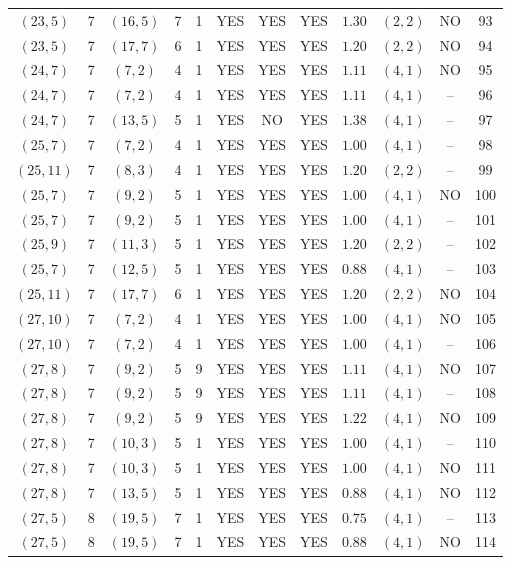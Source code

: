 \begin{longtable}{|c|c|c|c|c|c|c|c|c|c|c|c|}
$(23,5)$ & 7 & $(16,5)$ & 7 & 1 & YES & YES & YES & $1.30$ & $(2,2)$ & NO & 93\\
$(23,5)$ & 7 & $(17,7)$ & 6 & 1 & YES & YES & YES & $1.20$ & $(2,2)$ & NO & 94\\
$(24,7)$ & 7 & $(7,2)$ & 4 & 1 & YES & YES & YES & $1.11$ & $(4,1)$ & NO & 95\\
$(24,7)$ & 7 & $(7,2)$ & 4 & 1 & YES & YES & YES & $1.11$ & $(4,1)$ & -- & 96\\
$(24,7)$ & 7 & $(13,5)$ & 5 & 1 & YES & NO & YES & $1.38$ & $(4,1)$ & -- & 97\\
$(25,7)$ & 7 & $(7,2)$ & 4 & 1 & YES & YES & YES & $1.00$ & $(4,1)$ & -- & 98\\
$(25,11)$ & 7 & $(8,3)$ & 4 & 1 & YES & YES & YES & $1.20$ & $(2,2)$ & -- & 99\\
$(25,7)$ & 7 & $(9,2)$ & 5 & 1 & YES & YES & YES & $1.00$ & $(4,1)$ & NO & 100\\
$(25,7)$ & 7 & $(9,2)$ & 5 & 1 & YES & YES & YES & $1.00$ & $(4,1)$ & -- & 101\\
$(25,9)$ & 7 & $(11,3)$ & 5 & 1 & YES & YES & YES & $1.20$ & $(2,2)$ & -- & 102\\
$(25,7)$ & 7 & $(12,5)$ & 5 & 1 & YES & YES & YES & $0.88$ & $(4,1)$ & -- & 103\\
$(25,11)$ & 7 & $(17,7)$ & 6 & 1 & YES & YES & YES & $1.20$ & $(2,2)$ & NO & 104\\
$(27,10)$ & 7 & $(7,2)$ & 4 & 1 & YES & YES & YES & $1.00$ & $(4,1)$ & NO & 105\\
$(27,10)$ & 7 & $(7,2)$ & 4 & 1 & YES & YES & YES & $1.00$ & $(4,1)$ & -- & 106\\
$(27,8)$ & 7 & $(9,2)$ & 5 & 9 & YES & YES & YES & $1.11$ & $(4,1)$ & NO & 107\\
$(27,8)$ & 7 & $(9,2)$ & 5 & 9 & YES & YES & YES & $1.11$ & $(4,1)$ & -- & 108\\
$(27,8)$ & 7 & $(9,2)$ & 5 & 9 & YES & YES & YES & $1.22$ & $(4,1)$ & NO & 109\\
$(27,8)$ & 7 & $(10,3)$ & 5 & 1 & YES & YES & YES & $1.00$ & $(4,1)$ & -- & 110\\
$(27,8)$ & 7 & $(10,3)$ & 5 & 1 & YES & YES & YES & $1.00$ & $(4,1)$ & NO & 111\\
$(27,8)$ & 7 & $(13,5)$ & 5 & 1 & YES & YES & YES & $0.88$ & $(4,1)$ & NO & 112\\
$(27,5)$ & 8 & $(19,5)$ & 7 & 1 & YES & YES & YES & $0.75$ & $(4,1)$ & -- & 113\\
$(27,5)$ & 8 & $(19,5)$ & 7 & 1 & YES & YES & YES & $0.88$ & $(4,1)$ & NO & 114\\

\end{longtable}

